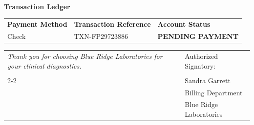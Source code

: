 \documentclass[10pt,letterpaper]{article}
\begin{document}
\vspace{1em}

{\fontsize{12pt}{14pt}\selectfont\bfseries\color{brandsecondary} Transaction Ledger}
\vspace{0.5em}
\begin{tabularx}{\textwidth}{@{}X X X@{}}
    {\bfseries Payment Method} & {\bfseries Transaction Reference} & {\bfseries Account Status} \\
    Check & TXN-FP29723886 & {\bfseries\color{brandprimary} PENDING PAYMENT} \\
\end{tabularx}

\vspace{4em}

\begin{tabularx}{\textwidth}{@{}X l@{}}
    \textit{Thank you for choosing Blue Ridge Laboratories for your clinical diagnostics.} & Authorized Signatory:\\
    & \\ \cline{2-2}
    & Sandra Garrett \\
    & Billing Department \\
    & Blue Ridge Laboratories \\
\end{tabularx}
\end{document}
